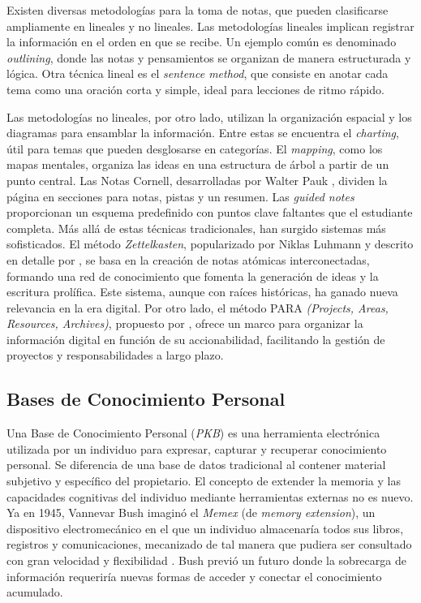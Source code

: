 Existen diversas metodologías para la toma de notas, que pueden clasificarse ampliamente en lineales y no lineales.
Las metodologías lineales implican registrar la información en el orden en que se recibe. Un ejemplo común es denominado \textit{outlining}, donde las notas y pensamientos se organizan de manera estructurada y lógica. Otra técnica lineal es el \textit{sentence method}, que consiste en anotar cada tema como una oración corta y simple, ideal para lecciones de ritmo rápido.

Las metodologías no lineales, por otro lado, utilizan la organización espacial y los diagramas para ensamblar la información. Entre estas se encuentra el \textit{charting}, útil para temas que pueden desglosarse en categorías. El \textit{mapping}, como los mapas mentales, organiza las ideas en una estructura de árbol a partir de un punto central. Las Notas Cornell, desarrolladas por Walter Pauk \parencite{paukHowStudyCollege2010}, dividen la página en secciones para notas, pistas y un resumen. Las \textit{guided notes} proporcionan un esquema predefinido con puntos clave faltantes que el estudiante completa.
Más allá de estas técnicas tradicionales, han surgido sistemas más sofisticados. El método \textit{Zettelkasten}, popularizado por Niklas Luhmann y descrito en detalle por \cite{ahrensHowTakeSmart2017}, se basa en la creación de notas atómicas interconectadas, formando una red de conocimiento que fomenta la generación de ideas y la escritura prolífica. Este sistema, aunque con raíces históricas, ha ganado nueva relevancia en la era digital. Por otro lado, el método PARA \textit{(Projects, Areas, Resources, Archives)}, propuesto por \cite{forteBuildingSecondBrain2022}, ofrece un marco para organizar la información digital en función de su accionabilidad, facilitando la gestión de proyectos y responsabilidades a largo plazo.

\subsection{Bases de Conocimiento Personal}
\label{subsec:pkb}
Una Base de Conocimiento Personal (\textit{PKB}) es una herramienta electrónica utilizada por un individuo para expresar, capturar y recuperar conocimiento personal. Se diferencia de una base de datos tradicional al contener material subjetivo y específico del propietario. El concepto de extender la memoria y las capacidades cognitivas del individuo mediante herramientas externas no es nuevo. Ya en 1945, Vannevar Bush imaginó el \textit{Memex} (de \textit{memory extension}), un dispositivo electromecánico en el que un individuo almacenaría todos sus libros, registros y comunicaciones, mecanizado de tal manera que pudiera ser consultado con gran velocidad y flexibilidad \parencite{bushWeMayThink1945}. Bush previó un futuro donde la sobrecarga de información requeriría nuevas formas de acceder y conectar el conocimiento acumulado.

